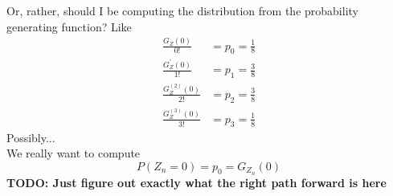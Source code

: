\documentclass[10pt]{amsart}
\begin{document}
Or, rather, should I be computing the distribution from the probability generating function? Like
\begin{align*}
\frac{G_Z(0)}{0!} &= p_0 = \frac 1 8\\
\frac{G_Z^\prime(0)}{1!} &= p_1 = \frac 3 8 \\
\frac{G_Z^{(2)}(0)}{2!} &= p_2 = \frac 3 8 \\
\frac{G_Z^{(3)}(0)}{3!} &= p_3 = \frac 1 8
\end{align*}
Possibly... \\

\noindent
We really want to compute
$$
P(Z_n = 0) = p_0 = G_{Z_n}(0)
$$
\textbf{TODO: Just figure out exactly what the right path forward is here}

\newpage
\end{document}
